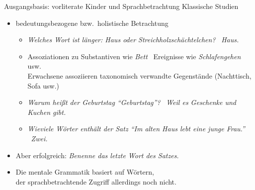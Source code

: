 \begin{frame}
  {Ausgangsbasis: vorliterate Kinder und Sprachbetrachtung}
  \onslide<+->
  \onslide<+->
  Klassische Studien \\
  \Halbzeile
  \onslide<+->
  \begin{itemize}[<+->]
    \item \alert{bedeutungsbezogene} bzw.\ \alert{holistische} Betrachtung
      \Viertelzeile
      \begin{itemize}
        \item \textit{Welches Wort ist länger: Haus oder Streichholzschächtelchen?} \ \textit{Haus.}
          \Viertelzeile
        \item Assoziationen zu Substantiven wie \textit{Bett} \ \alert{Ereignisse} wie \textit{Schlafengehen} usw.\\
          Erwachsene assoziieren \alert{taxonomisch verwandte Gegenstände} (Nachttisch, Sofa usw.)
          \Viertelzeile
        \item \textit{Warum heißt der Geburtstag  "`Geburtstag"'?} \ \textit{Weil es Geschenke und Kuchen gibt.}
          \Viertelzeile
        \item \textit{Wieviele Wörter enthält der Satz "`Im alten Haus lebt eine junge Frau."'} \ \textit{Zwei.}
      \end{itemize}
      \Halbzeile
    \item Aber \alert{erfolgreich}: \textit{Benenne das letzte Wort des Satzes.}
      \Halbzeile
    \item[\ding{222}] Die mentale Grammatik basiert auf Wörtern,\\
      der sprachbetrachtende Zugriff allerdings noch nicht.
  \end{itemize}
\end{frame}

